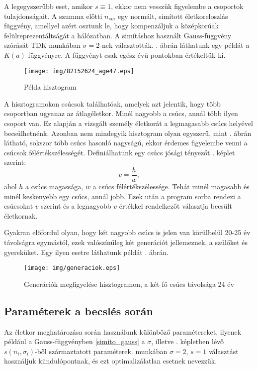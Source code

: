 \documentclass[12pt]{article}
\begin{document}
A legegyszerűbb eset, amikor $s\equiv 1$, ekkor nem vesszük figyelembe a csoportok tulajdonságait.
A szumma előtti $n_{sm}$ egy normált, simított életkoreloszlás függvény, amellyel azért osztunk le, hogy kompenzáljuk a középkorúak felülreprezentáltságát a hálózatban.
A simításhoz használt Gauss-függvény szórását  TDK munkában $\sigma=2$-nek választották. . ábrán láthatunk egy példát a $K(a)$ függvényre. A függvényt csak egész évű pontokban értékeltük ki.
\begin{figure}[H]
	\centering
	\texttt{[image: img/82152624\_age47.eps]}
	\caption{Példa hisztogram} %
	\label{hisztogram_pelda}
\end{figure}
A hisztogramokon csúcsok találhatóak, amelyek azt jelentik, hogy több csoportban ugyanaz az átlagéletkor. Minél nagyobb a csúcs, annál több ilyen csoport van. Ez alapján a vizsgált személy életkorát a legmagasabb csúcs helyével becsülhetnénk. Azonban nem mindegyik hisztogram olyan egyszerű, mint . ábrán látható, sokszor több csúcs hasonló nagyságú, ekkor érdemes figyelembe venni a csúcsok félértékszélességét. Definiálhatunk egy csúcs jósági tényezőt . képlet szerint:
\begin{equation} \label{csucs_josag}
	v = \frac{h}{w},
\end{equation}
ahol $h$ a csúcs magassága, $w$ a csúcs félértékszélessége. Tehát minél magasabb és minél keskenyebb egy csúcs, annál jobb. Ezek után a program sorba rendezi a csúcsokat $v$ szerint és a legnagyobb $v$ értékkel rendelkezőt választja becsült életkornak.

Gyakran előfordul olyan, hogy két nagyobb csúcs is jelen van körülbelül 20-25 év távolságra egymástól, ezek valószínűleg két generációt jellemeznek, a szülőket és gyereküket. Egy ilyen esetre láthatunk példát . ábrán.
\begin{figure}[H]
	\centering
	\texttt{[image: img/generaciok.eps]}
	\caption{Generációk megfigyelése hisztogramon, a két fő csúcs távolsága 24 év}
	\label{generaciok}
\end{figure}

\iffalse
Azt is meg kell említenünk, hogy a hisztogram simítása miatt a csúcs helye eltolódhat, ha a csúcs egyik oldalán sokkal több csoport van, mint a másikon.
\begin{figure}[H]
	\centering
	\texttt{[image: img/]}
\end{figure}
\fi
\subsection{Paraméterek a becslés során} \label{parameterek_subsection}
Az életkor meghatározása során használunk különböző paramétereket, ilyenek például a Gauss-függvényben \eqref{simito_gauss} a $\sigma$\iffalse TODO: na jó nem biztos, hogy így szép \fi, illetve . képletben lévő $s(n_i, \sigma_i)$-ből származtatott paraméterek.  munkában $\sigma=2$, $s=1$ választást használjuk kiindulópontnak, és
ezt optimalizálatlan esetnek nevezzük.
\end{document}

